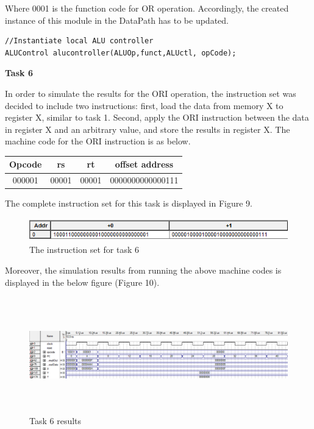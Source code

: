 \documentclass[12pt,a4paper]{article}
\begin{document}
	\noindent Where 0001 is the function code for OR operation. Accordingly, the created instance of this module in the DataPath has to be updated.
	
		\begin{lstlisting}[style={verilog-style}]
//Instantiate local ALU controller
ALUControl alucontroller(ALUOp,funct,ALUctl, opCode);
	\end{lstlisting}
	
	\vspace{0.4cm}
	\noindent \textbf{\large Task 6}
	\vspace{0.2cm}
	
	\noindent In order to simulate the results for the ORI operation, the instruction set was decided to include two instructions: first, load the data from memory X to register X, similar to task 1. Second, apply the ORI instruction between the data in register X and an arbitrary value, and store the results in register X. The machine code for the ORI instruction is as below. 
	\begin{table}[H]
		\centering
		\begin{tabular}{|c | c| c| c|}
			\hline
			\textbf{Opcode} & \textbf{rs} & \textbf{rt}& \textbf{offset address}\\ \hline
			000001& 00001 & 00001 & 0000000000000111\\\hline
		\end{tabular}
	\end{table}

	\noindent The complete instruction set for this task is displayed in Figure 9.
	
	\begin{figure}[H]
		\centering
		\includegraphics[height=1cm,width=14cm]{figures/code5.png}
		\caption{The instruction set for task 6}
	\end{figure}

	\noindent Moreover, the simulation results from running the above machine codes is displayed in the below figure (Figure 10).
	
		
	\begin{figure}[H]
		\centering
		\includegraphics[height=5cm,width=15cm]{figures/simulations5.png}
		\caption{Task 6 results}
	\end{figure}
\end{document}
